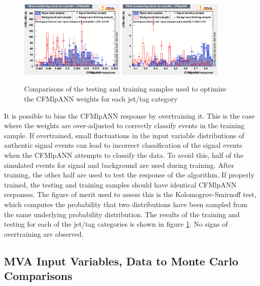 \begin{figure}[hbtp]
\begin{center}
   \includegraphics[width=0.45\textwidth]{Figures/Analysis_1_Diagrams/overtrain_CFMlpANN_5j4ormoret.png}
   \includegraphics[width=0.45\textwidth]{Figures/Analysis_1_Diagrams/overtrain_CFMlpANN_6ormorej4ormoret.png}
      \caption{Comparisons of the testing and training samples used to
      optimize the CFMlpANN weights for each jet/tag category}
   \label{fig:ann_testTrain}
 \end{center}
\end{figure}

\par It is possible to bias the CFMlpANN response by overtraining
it.  This is the case where the weights are over-adjusted to correctly
classify events in the training sample.  If overtrained, small
fluctuations in the input variable distributions of authentic signal
events can lead to incorrect classification of the signal events when
the CFMlpANN attempts to classify the data.  To avoid this, half of
the simulated events for \ttH signal and \ttjets background are used
during training.  After training, the other half are used to test the
response of the algorithm.  If properly trained, the testing and
training samples should have identical CFMlpANN responses.  The figure
of merit used to assess this is the Kolomogrov-Smirnoff test, which
computes the probability that two distributions have been sampled from
the same underlying probability distribution.  The results of the
training and testing for each of the jet/tag categories is shown in
figure \ref{fig:ann_testTrain}.  No signs of overtraining are observed.


\subsection{MVA Input Variables, Data to Monte Carlo Comparisons}
\label{mva_input_vars_data_to_mc_overview}

